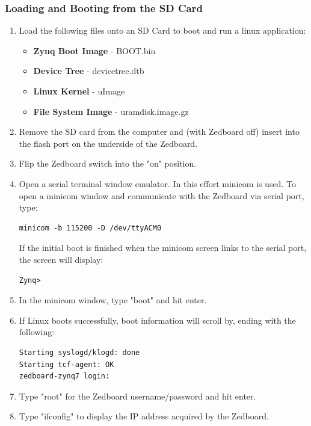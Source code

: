 \documentclass[12pt]{article}
\begin{document}
\subsubsection{Loading and Booting from the SD Card}\label{subsubsec:SD}
\begin{enumerate}
\item Load the following files onto an SD Card to boot and run a linux application:
\begin{itemize}
\item \textbf{Zynq Boot Image} - BOOT.bin
\item \textbf{Device Tree} - devicetree.dtb
\item \textbf{Linux Kernel} - uImage
\item \textbf{File System Image} - uramdisk.image.gz
\end{itemize}
\item Remove the SD card from the computer and (with Zedboard off) insert into the flash port on the underside of the Zedboard.
\item Flip the Zedboard switch into the "on" position.
\item Open a serial terminal window emulator.  In this effort minicom is used.  To open a minicom window and communicate with the Zedboard via serial port, type: \label{itm:minicom}
\begin{lstlisting}
minicom -b 115200 -D /dev/ttyACM0
\end{lstlisting}
If the initial boot is finished when the minicom screen links to the serial port, the screen will display:
\begin{lstlisting}
Zynq>
\end{lstlisting}
\item In the minicom window, type "boot" and hit enter.
\item If Linux boots successfully, boot information will scroll by, ending with the following:
\begin{lstlisting}
Starting syslogd/klogd: done
Starting tcf-agent: OK
zedboard-zynq7 login:
\end{lstlisting}
\item Type "root" for the Zedboard username/password and hit enter.
\item Type "ifconfig" to display the IP address acquired by the Zedboard.
\end{enumerate}
\end{document}
